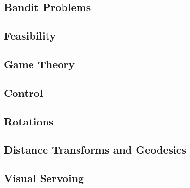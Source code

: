 \subsection{Bandit Problems}

\subsection{Feasibility}

\subsection{Game Theory}

\subsection{Control}

\subsection{Rotations}

\subsection{Distance Transforms and Geodesics}

\subsection{Visual Servoing}

